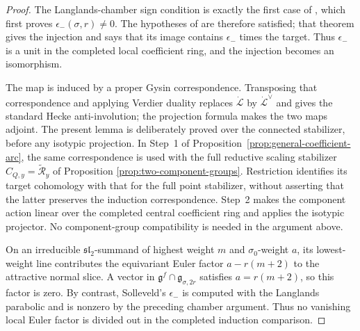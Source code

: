 \documentclass[10pt,a4paper]{amsart}
\begin{document}
\begin{proof}
The Langlands-chamber sign condition is exactly the first case of
\cite[Lemma~B.3]{Solleveld}, which first proves
$\epsilon_-(\sigma,r)\ne0$.  The hypotheses of
\cite[Theorem~B.2(a)]{Solleveld} are therefore satisfied; that theorem gives
the injection and says that its image contains $\epsilon_-$ times the target.
Thus $\epsilon_-$ is a unit in the completed local
coefficient ring, and the injection becomes an isomorphism.

The map is induced by a proper Gysin correspondence.  Transposing that
correspondence and applying Verdier duality replaces
$\dot{\mathcal L}$ by $\dot{\mathcal L}^{\vee}$ and gives the standard Hecke
anti-involution; the projection formula makes the two maps adjoint.  The
present lemma is deliberately proved over the connected stabilizer, before
any isotypic projection.  In Step~1 of
Proposition~\ref{prop:general-coefficient-arc}, the same correspondence is
used with the full reductive scaling stabilizer
$C_{Q,y}=\widetilde{\mathcal R}_y$ of Proposition
\ref{prop:two-component-groups}.  Restriction identifies its target
cohomology with that for the full point stabilizer, without asserting
that the latter preserves the induction correspondence.  Step~2 makes the component
action linear over the completed central coefficient ring and applies the
isotypic projector.  No component-group compatibility is needed in the
argument above.

On an irreducible $\mathfrak{sl}_2$-summand of highest weight
$m$ and $\sigma_0$-weight $a$, its lowest-weight line contributes the
equivariant Euler factor $a-r(m+2)$ to the attractive normal slice.  A vector in
$\mathfrak g^f\cap\mathfrak g_{\sigma,2r}$ satisfies
$a=r(m+2)$, so this factor is zero.  By contrast, Solleveld's
$\epsilon_-$ is computed with the Langlands parabolic and is nonzero by the
preceding chamber argument.  Thus no vanishing local Euler factor is divided
out in the completed induction comparison.
\end{proof}
\end{document}
